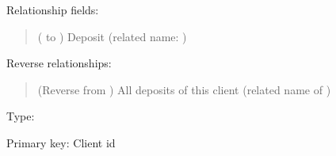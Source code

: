 \documentclass[letterpaper,10pt,russian]{sphinxmanual}
\begin{document}
\begin{fulllineitems}
\begin{quote}
\begin{description}
\begin{itemize}
\end{itemize}

\end{description}\end{quote}

\sphinxAtStartPar
Relationship fields:
\begin{quote}\begin{description}
\sphinxAtStartPar
{} ( to {\hyperref[\detokenize{myapp:polls.models.Deposit}]{}}) \textendash{} Deposit (related name: {\hyperref[\detokenize{myapp:polls.models.Deposit.clients}]{}})

\end{description}\end{quote}

\sphinxAtStartPar
Reverse relationships:
\begin{quote}\begin{description}
\sphinxAtStartPar
{} (Reverse  from {\hyperref[\detokenize{myapp:polls.models.Deposit}]{}}) \textendash{} All deposits of this client (related name of {\hyperref[\detokenize{myapp:polls.models.Deposit.client_id1}]{}})

\end{description}\end{quote}

\begin{fulllineitems}
\label{\detokenize{myapp:polls.models.Client.client_id}}
\pysigstartsignatures
\pysigline
{}
\pysigstopsignatures
\sphinxAtStartPar
Type: 

\sphinxAtStartPar
Primary key: Client id


\end{fulllineitems}
\end{fulllineitems}
\end{document}
